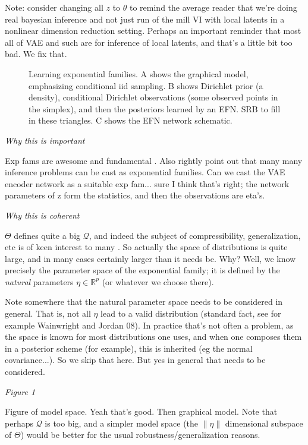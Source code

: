 \documentclass{article}
\begin{document}
 Note: consider changing all $z$ to $\theta$ to remind the average reader that we're doing real bayesian inference and not just run of the mill VI with local latents in a nonlinear dimension reduction setting.  Perhaps an important reminder that most all of VAE and such are for inference of local latents, and that's a little bit too bad.  We fix that.

\begin{figure}
  \centering

  \caption{Learning exponential families.  A shows the graphical model, emphasizing conditional iid sampling.  B shows Dirichlet prior (a density), conditional Dirichlet observations (some observed points in the simplex), and then the posteriors learned by an EFN.  SRB to fill in these triangles.   C shows the EFN network schematic.}
\end{figure}


 \emph{Why this is important}
 
Exp fams are awesome and fundamental \cite{}.  Also \cite{wainwrightjordan2008graphical} rightly point out that many many inference problems can be cast as exponential families.  Can we cast the VAE encoder network as a suitable exp fam... sure I think that's right; the network parameters of z form the statistics, and then the observations are eta's.  
 
 \emph{Why this is coherent}
 
 $\Theta$ defines quite a big $\mathcal{Q}$, and indeed the subject of compressibility, generalization, etc is of keen interest to many \cite{zhou2018compressability}.  So actually the space of distributions is quite large, and in many cases certainly larger than it needs be.  Why?  Well, we know precisely the parameter space of the exponential family; it is defined by the \emph{natural} parameters $\eta \in \mathbb{R}^p$ (or whatever we choose there).
 
 Note somewhere that the natural parameter space needs to be considered in general.  That is, not all $\eta$ lead to a valid distribution (standard fact, see for example Wainwright and Jordan 08).  In practice that's not often a problem, as the space is known for most distributions one uses, and when one composes them in a posterior scheme (for example), this is inherited (eg the normal covariance...).  So we skip that here.  But yes in general that needs to be considered.
 
 \emph{Figure 1}
 
 Figure of model space.  Yeah that's good.  Then graphical model.
 Note that perhaps $\mathcal{Q}$ is too big, and a simpler model space (the $\|\eta\|$ dimensional subspace of $\Theta$) would be better for the usual robustness/generalization reasons.  
 
\end{document}
